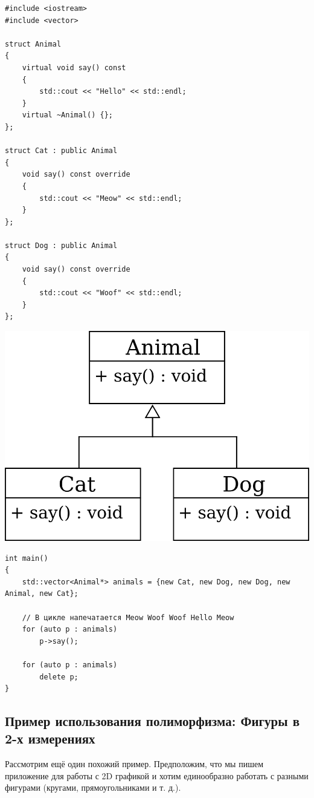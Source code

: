 \documentclass{article}
\begin{document}
\noindent
\begin{minipage}{0.5\textwidth}
\begin{lstlisting}[style=csMiptCppStyle]
#include <iostream>
#include <vector>

struct Animal
{
    virtual void say() const
    {
        std::cout << "Hello" << std::endl;
    }
    virtual ~Animal() {};
};

struct Cat : public Animal
{
    void say() const override
    {
        std::cout << "Meow" << std::endl;
    }
};

struct Dog : public Animal
{
    void say() const override
    {
        std::cout << "Woof" << std::endl;
    }
};
\end{lstlisting}
\end{minipage}
\begin{minipage}{0.5\textwidth}
\begin{center}
\includegraphics[scale=0.9]{../images/animals.png}
\end{center}
\end{minipage}

\begin{lstlisting}[style=csMiptCppStyle]
int main()
{
    std::vector<Animal*> animals = {new Cat, new Dog, new Dog, new Animal, new Cat};
    
    // В цикле напечатается Meow Woof Woof Hello Meow
    for (auto p : animals)
        p->say();
    
    for (auto p : animals)
        delete p;
}
\end{lstlisting}


\subsection*{Пример использования полиморфизма: Фигуры в 2-х измерениях}
Рассмотрим ещё один похожий пример. Предположим, что мы пишем приложение для работы с 2D графикой и хотим единообразно работать с разными фигурами (кругами, прямоугольниками и т. д.).
\end{document}
